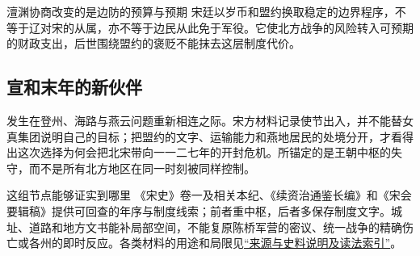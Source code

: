 \begin{turningpoint}{澶渊协商改变的是边防的预算与预期}
宋廷以岁币和盟约换取稳定的边界程序，不等于辽对宋的从属，亦不等于边民从此免于军役。它使北方战争的风险转入可预期的财政支出，后世围绕盟约的褒贬不能抹去这层制度代价。
\end{turningpoint}

\subsection{宣和末年的新伙伴}
发生在登州、海路与燕云问题重新相连之际。宋方材料记录使节出入，并不能替女真集团说明自己的目标；把盟约的文字、运输能力和燕地居民的处境分开，才看得出这次选择为何会把北宋带向一一二七年的开封危机。所锚定的是王朝中枢的失守，而不是所有北方地区在同一时刻被同样控制。

\begin{sourcenote}{这组节点能够证实到哪里}
《宋史》卷一及相关本纪、《续资治通鉴长编》和《宋会要辑稿》提供可回查的年序与制度线索；前者重中枢，后者多保存制度文字。城址、道路和地方文书能补局部空间，不能复原陈桥军营的密议、统一战争的精确伤亡或各州的即时反应。各类材料的用途和局限见\hyperref[app:sources]{“来源与史料说明及读法索引”}。
\end{sourcenote}

